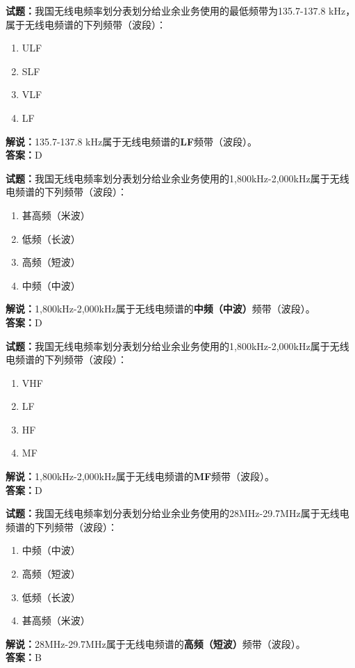 \documentclass{ctexbook}
\begin{document}
\bigskip

\noindent\textbf{试题：}我国无线电频率划分表划分给业余业务使用的最低频带为135.7-137.8 \unit{\kHz}，属于无线电频谱的下列频带（波段）：
\begin{enumerate}[leftmargin=3em]
  \item ULF
  \item SLF
  \item VLF
  \item LF
\end{enumerate}
\noindent\textbf{解说：}135.7-137.8 \unit{\kHz}属于无线电频谱的\textbf{LF}频带（波段）。\\\noindent\textbf{答案：}D

\bigskip

\noindent\textbf{试题：}我国无线电频率划分表划分给业余业务使用的1,800\unit{\kHz}-2,000\unit{\kHz}属于无线电频谱的下列频带（波段）：
\begin{enumerate}[leftmargin=3em]
  \item 甚高频（米波）
  \item 低频（长波）
  \item 高频（短波）
  \item 中频（中波）
\end{enumerate}
\noindent\textbf{解说：}1,800\unit{\kHz}-2,000\unit{\kHz}属于无线电频谱的\textbf{中频（中波）}频带（波段）。\\\noindent\textbf{答案：}D

\bigskip

\noindent\textbf{试题：}我国无线电频率划分表划分给业余业务使用的1,800\unit{\kHz}-2,000\unit{\kHz}属于无线电频谱的下列频带（波段）：
\begin{enumerate}[leftmargin=3em]
  \item VHF
  \item LF
  \item HF
  \item MF
\end{enumerate}
\noindent\textbf{解说：}1,800\unit{\kHz}-2,000\unit{\kHz}属于无线电频谱的\textbf{MF}频带（波段）。\\\noindent\textbf{答案：}D

\bigskip

\noindent\textbf{试题：}我国无线电频率划分表划分给业余业务使用的28\unit{\MHz}-29.7\unit{\MHz}属于无线电频谱的下列频带（波段）：
\begin{enumerate}[leftmargin=3em]
  \item 中频（中波）
  \item 高频（短波）
  \item 低频（长波）
  \item 甚高频（米波）
\end{enumerate}
\noindent\textbf{解说：}28\unit{\MHz}-29.7\unit{\MHz}属于无线电频谱的\textbf{高频（短波）}频带（波段）。\\\noindent\textbf{答案：}B
\end{document}
